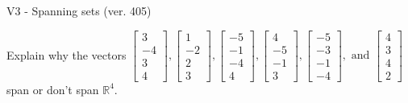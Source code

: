 \begin{exercise}
  \begin{exerciseTitle}V3 - Spanning sets (ver. 405)\end{exerciseTitle}
  \begin{exerciseStatement}
    Explain why the vectors \(\left[\begin{array}{r}
3 \\
-4 \\
3 \\
4
\end{array}\right] , \left[\begin{array}{r}
1 \\
-2 \\
2 \\
3
\end{array}\right] , \left[\begin{array}{r}
-5 \\
-1 \\
-4 \\
4
\end{array}\right] , \left[\begin{array}{r}
4 \\
-5 \\
-1 \\
3
\end{array}\right] , \left[\begin{array}{r}
-5 \\
-3 \\
-1 \\
-4
\end{array}\right] , \text{ and } \left[\begin{array}{r}
4 \\
3 \\
4 \\
2
\end{array}\right]\) span or don't span \(\mathbb{R}^4\). 
	



\end{exerciseStatement}
\end{exercise}
